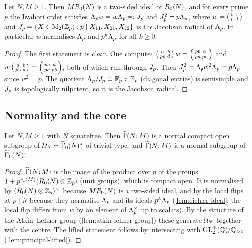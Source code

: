 \begin{lemma}\label{lem:eichler-ideal}
Let $N, M \geq 1$. Then $MR_{0}(N)$ is a two-sided ideal of
$R_{0}(N)$, and for every prime $p$ the Iwahori order satisfies
$\Lambda_{p} w = w\Lambda_{p} =: J_{p}$ and
$J_{p}^{2} = p\Lambda_{p}$, where $w = \left(\begin{smallmatrix} 0 & 1 \\ p & 0 \end{smallmatrix}\right)$
and $J_{p} = \{X \in \mathrm{M}_{2}(\mathbb{Z}_{p}) :
p \mid X_{11}, X_{21}, X_{22}\}$ is the Jacobson radical of
$\Lambda_{p}$. In particular $w$ normalises $\Lambda_{p}$ and
$p^{k}\Lambda_{p}$ for all $k \geq 0$.
\end{lemma}

\begin{proof}
The first statement is clear. One computes
$\left(\begin{smallmatrix} a & b \\ pc & d \end{smallmatrix}\right)w = \left(\begin{smallmatrix} pb & a \\ pd & pc \end{smallmatrix}\right)$ and
$w\left(\begin{smallmatrix} a & b \\ pc & d \end{smallmatrix}\right) = \left(\begin{smallmatrix} pc & d \\ pa & pb \end{smallmatrix}\right)$, both of which run
through $J_{p}$. Then $J_{p}^{2} =
\Lambda_{p}w^{2}\Lambda_{p} = p\Lambda_{p}$ since $w^{2} = p$.
The quotient $\Lambda_{p}/J_{p} \cong \mathbb{F}_{p}\times\mathbb{F}_{p}$
(diagonal entries) is semisimple and $J_{p}$ is topologically
nilpotent, so it is the Jacobson radical.
\end{proof}

\subsection{Normality and the core}

\begin{proposition}\label{prop:principal-normal}
Let $N, M \geq 1$ with $N$ squarefree. Then $\GammaPrincipal[ad]{N}{M}$ is a
normal compact open subgroup of $\MaxCompact{N} = \GammaZeroStar[ad]{N}$ of
trivial type, and $\GammaPrincipal[lift]{N}{M}$ is a normal subgroup of
$\GammaZeroStar[lift]{N}$.
\end{proposition}

\begin{proof}
$\GammaPrincipal[ad]{N}{M}$ is the image of the product over $p$ of the
groups $1 + p^{v_{p}(M)}(R_{0}(N)\otimes\mathbb{Z}_{p})$ (unit
groups), which is compact open. It is normalised by
$(R_{0}(N)\otimes\mathbb{Z}_{p})^{\times}$ because
$MR_{0}(N)$ is a two-sided ideal, and by the local flips at
$p \mid N$ because they normalise $\Lambda_{p}$ and its ideals
$p^{k}\Lambda_{p}$ (\cref{lem:eichler-ideal}; the local flip differs
from $w$ by an element of $\Lambda_{p}^{\times}$ up to scalars). By the
structure of the Atkin--Lehner group (\cref{lem:atkin-lehner-group}) these
generate $\mathcal{U}_{N}$ together with the centre. The lifted statement
follows by intersecting with $\mathrm{GL}_{2}^{+}(\mathbb{Q})/\mathbb{Q}_{>0}$
(\cref{lem:principal-lifted}).
\end{proof}

